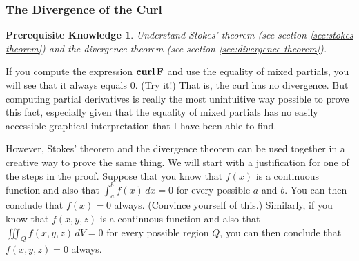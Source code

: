 \documentclass{myarticle}
\let\div\relax %
\DeclareMathOperator{\div}{div}
\DeclareMathOperator{\curl}{\mathbf{curl}}
\renewcommand{\vec}[1]{\mathbf{#1}}
\theoremstyle{nospace}
\newtheorem*{oldprereq}{Prerequisite Knowledge}
\newenvironment{prereq}
{\begin{mdframed}\begin{oldprereq}}
    {\end{oldprereq}\end{mdframed}}
\newtheorem{old series theorem}{Theorem}
\newenvironment{series theorem}
{\begin{mdframed}\begin{old series theorem}}
    {\end{old series theorem}\end{mdframed}}
\begin{document}
\subsubsection{The Divergence of the Curl}
\label{sec:divergence of curl}

\begin{prereq}
  Understand Stokes' theorem (see section \ref{sec:stokes theorem})
  and the divergence theorem (see section \ref{sec:divergence
    theorem}).
\end{prereq}

If you compute the expression $\div \curl \vec{F}$ and use the
equality of mixed partials, you will see that it always equals $0$.
(Try it!) That is, the curl has no divergence. But computing partial
derivatives is really the most unintuitive way possible to prove this
fact, especially given that the equality of mixed partials has no
easily accessible graphical interpretation that I have been able to
find.

However, Stokes' theorem and the divergence theorem can be used
together in a creative way to prove the same thing. We will start with
a justification for one of the steps in the proof. Suppose that you
know that $f(x)$ is a continuous function and also that
$\int_a^b f(x) \,dx = 0$ for every possible $a$ and $b$. You can then
conclude that $f(x) = 0$ always. (Convince yourself of this.)
Similarly, if you know that $f(x, y, z)$ is a continuous function and
also that $\iiint_Q f(x, y, z) \,dV = 0$ for every possible region
$Q$, you can then conclude that $f(x, y, z) = 0$ always.
\end{document}
